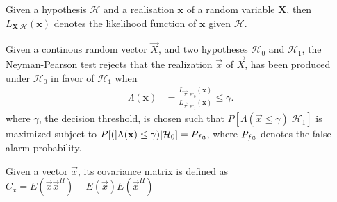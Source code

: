 \documentclass[a4paper, openany, oneside]{memoir}
\begin{document}
\begin{blockDefinition}
Given a hypothesis $\mathcal{H}$ and a realisation $\mathbf{x}$ of a random variable $\mathbf{X}$, then $L_{\mathbf{X} | \mathcal{H}}(\mathbf{x})$ denotes the likelihood function of $\mathbf{x}$ given $\mathcal{H}$.
\end{blockDefinition}

\begin{blockDefinition}
Given a continous random vector $\vec{X}$, and two hypotheses $\mathcal{H}_0$ and $\mathcal{H}_1$, the Neyman-Pearson test rejects that the realization $\vec{x}$ of $\vec{X}$, has been produced under $\mathcal{H}_0$ in favor of $\mathcal{H}_1$
when
\begin{align*}
    \Lambda (\mathbf{x}) &= \frac{L_{\vec{X} | \mathcal{H}_0} (\mathbf{x})}{L_{\vec{X} | \mathcal{H}_1}(\mathbf{x})} \leq \gamma.
\end{align*}
where $\gamma$, the decision threshold, is chosen such that $P[\Lambda(\vec{x} \leq \gamma) | \mathcal{H}_1]$ is maximized subject to $P[(]\Lambda(\vec{x}) \leq \gamma) | \mathcal{H}_0] = P\ss{fa}$, where $P\ss{fa}$ denotes the false alarm probability. %
\end{blockDefinition}

\clearpage
\begin{blockDefinition}
Given a vector $\vec{x}$, its covariance matrix is defined as $C_{x} = E(\vec{x}\vec{x}^H)-E(\vec{x})E(\vec{x}^H)$
\end{blockDefinition}
\end{document}
